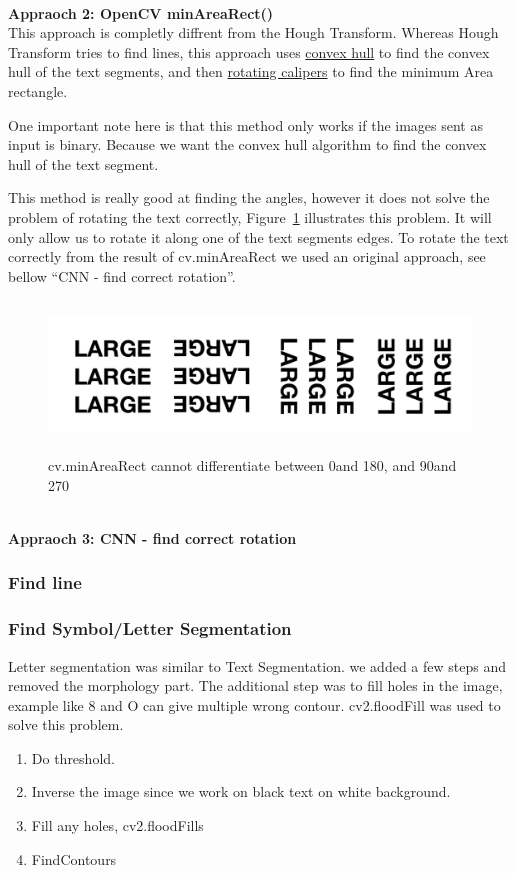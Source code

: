\documentclass[11pt,a4paper,UKenglish]{article}
\begin{document}
\noindent \\ \textbf{Appraoch 2: OpenCV minAreaRect()}
\noindent \\ This approach is completly diffrent from the Hough Transform.
Whereas Hough Transform tries to find lines, this approach uses
\href{https://en.wikipedia.org/wiki/Convex_hull}{convex hull} to find the
convex hull of the text segments, and then
\href{https://en.wikipedia.org/wiki/Rotating_calipers}{rotating calipers} to
find the minimum Area rectangle. \par
One important note here is that this method only works if the images sent as
input is binary. Because we want the convex hull algorithm to find the convex
hull of the text segment. \par
This method is really good at finding the angles, however it does not solve the
problem of rotating the text correctly, Figure~\ref{fig:4angle_rot} illustrates
this problem. It will only allow us to rotate it along one of the text
segments edges. To rotate the text correctly from the result of cv.minAreaRect
we used an original approach, see bellow ``CNN - find correct rotation''.

\begin{figure}[H]
  \centering
  \includegraphics[height=4cm]{res/4angle_rot.png}
  \caption{cv.minAreaRect cannot differentiate between 0\textdegree and 180\textdegree, and 90\textdegree and 270\textdegree}
  \label{fig:4angle_rot}
\end{figure}


\noindent \\ \textbf{Appraoch 3: CNN - find correct rotation}
\noindent \\






\subsubsection{Find line}
\subsubsection{Find Symbol/Letter Segmentation}
Letter segmentation was similar to Text Segmentation. we added a few steps and removed the morphology part. The additional step was to fill holes in the image, example like 8 and O can give multiple wrong contour. cv2.floodFill was used to solve this problem.
\begin{enumerate}
  \item Do threshold.
  \item Inverse the image since we work on black text on white background.
  \item Fill any holes, cv2.floodFills
  \item FindContours
\end{enumerate}
\end{document}
